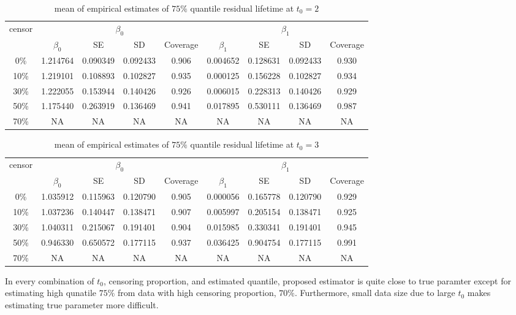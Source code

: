 \documentclass[12pt]{article}
\begin{document}
	\begin{table}[hbt!]
		\caption{mean of empirical estimates of $75\%$ quantile residual lifetime at $t_0=2$}
		\centering
		\begin{tabular}{|c|c|c|c|c|c|c|c|c|}
			\hline
			\multirow{2}{*}{censor} & \multicolumn{4}{c|}{$\beta_0$} & \multicolumn{4}{c|}{$\beta_1$}\\ \cline{2-9}
			& $\beta_0$ & SE & SD  & Coverage  & $\beta_1$ & SE & SD & Coverage\\
			\hline\hline
			0\% & 1.214764 & 0.090349 & 0.092433 & 0.906 & 0.004652 & 0.128631 & 0.092433 & 0.930 \\
			10\% & 1.219101 & 0.108893 & 0.102827 & 0.935 & 0.000125 & 0.156228 & 0.102827 & 0.934 \\
			30\% & 1.222055 & 0.153944 & 0.140426 & 0.926 & 0.006015 & 0.228313 & 0.140426 & 0.929 \\
			50\% & 1.175440 & 0.263919 & 0.136469 & 0.941 & 0.017895 & 0.530111 & 0.136469 & 0.987 \\
			70\% & NA & NA & NA & NA & NA & NA & NA & NA \\ 
			\hline
		\end{tabular}
	\end{table}
	\begin{table}[hbt!]
		\caption{mean of empirical estimates of $75\%$ quantile residual lifetime at $t_0=3$}
		\centering
		\begin{tabular}{|c|c|c|c|c|c|c|c|c|}
			\hline
			\multirow{2}{*}{censor} & \multicolumn{4}{c|}{$\beta_0$} & \multicolumn{4}{c|}{$\beta_1$}\\ \cline{2-9}
			& $\beta_0$ & SE & SD  & Coverage  & $\beta_1$ & SE & SD & Coverage\\
			\hline\hline
			0\% & 1.035912 & 0.115963 & 0.120790 & 0.905 & 0.000056 & 0.165778 & 0.120790 & 0.929 \\
			10\% & 1.037236 & 0.140447 & 0.138471 & 0.907 & 0.005997 & 0.205154 & 0.138471 & 0.925 \\
			30\% & 1.040311 & 0.215067 & 0.191401 & 0.904 & 0.015985 & 0.330341 & 0.191401 & 0.945 \\
			50\% & 0.946330 & 0.650572 & 0.177115 & 0.937 & 0.036425 & 0.904754 & 0.177115 & 0.991 \\
			70\% & NA & NA & NA & NA & NA & NA & NA & NA \\ 
			\hline
		\end{tabular}
	\end{table}
	In every combination of $t_0$, censoring proportion, and estimated quantile, proposed estimator is quite close to true paramter except for estimating high qunatile $75\%$ from data with high censoring proportion, $70\%$. Furthermore, small data size due to large $t_0$ makes estimating true parameter more difficult.\\
	
\end{document}
